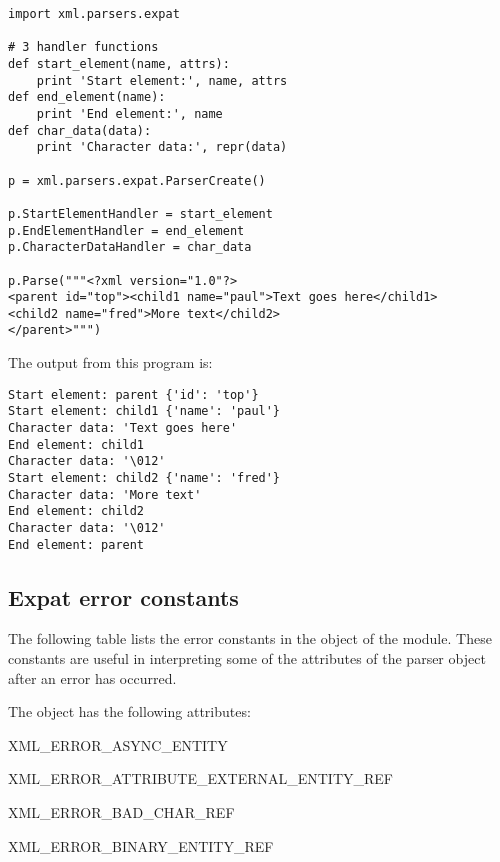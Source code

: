 \begin{verbatim}
import xml.parsers.expat

# 3 handler functions
def start_element(name, attrs):
    print 'Start element:', name, attrs
def end_element(name):
    print 'End element:', name
def char_data(data):
    print 'Character data:', repr(data)

p = xml.parsers.expat.ParserCreate()

p.StartElementHandler = start_element
p.EndElementHandler = end_element
p.CharacterDataHandler = char_data

p.Parse("""<?xml version="1.0"?>
<parent id="top"><child1 name="paul">Text goes here</child1>
<child2 name="fred">More text</child2>
</parent>""")
\end{verbatim}

The output from this program is:

\begin{verbatim}
Start element: parent {'id': 'top'}
Start element: child1 {'name': 'paul'}
Character data: 'Text goes here'
End element: child1
Character data: '\012'
Start element: child2 {'name': 'fred'}
Character data: 'More text'
End element: child2
Character data: '\012'
End element: parent
\end{verbatim}


\subsection{Expat error constants \label{expat-errors}}

The following table lists the error constants in the
 object of the  module.  These
constants are useful in interpreting some of the attributes of the
parser object after an error has occurred.

The  object has the following attributes:

\begin{datadesc}{XML_ERROR_ASYNC_ENTITY}
\end{datadesc}

\begin{datadesc}{XML_ERROR_ATTRIBUTE_EXTERNAL_ENTITY_REF}
\end{datadesc}

\begin{datadesc}{XML_ERROR_BAD_CHAR_REF}
\end{datadesc}

\begin{datadesc}{XML_ERROR_BINARY_ENTITY_REF}
\end{datadesc}

